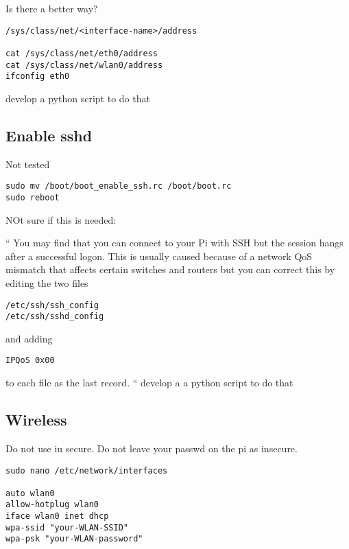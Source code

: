 Is there a better way?

\begin{lstlisting}
/sys/class/net/<interface-name>/address

cat /sys/class/net/eth0/address
cat /sys/class/net/wlan0/address
ifconfig eth0
\end{lstlisting}

develop a python script to do that

\subsection{Enable sshd}

Not tested

\begin{lstlisting}
sudo mv /boot/boot_enable_ssh.rc /boot/boot.rc
sudo reboot
\end{lstlisting}


NOt sure if this is needed:

``
You may find that you can connect to your Pi with SSH but the session
hangs after a successful logon. This is usually caused because of a
network QoS mismatch that affects certain switches and routers but you
can correct this by editing the two files

\begin{lstlisting}
/etc/ssh/ssh_config
/etc/ssh/sshd_config
\end{lstlisting}

and adding

\begin{lstlisting}
IPQoS 0x00
\end{lstlisting}

to each file as the last record.
``
develop a a python script to do that

\subsection{Wireless}

Do not use iu secure. Do not leave your passwd on the pi as insecure.

\begin{lstlisting}
sudo nano /etc/network/interfaces

auto wlan0
allow-hotplug wlan0
iface wlan0 inet dhcp
wpa-ssid "your-WLAN-SSID"
wpa-psk "your-WLAN-password"
\end{lstlisting}

